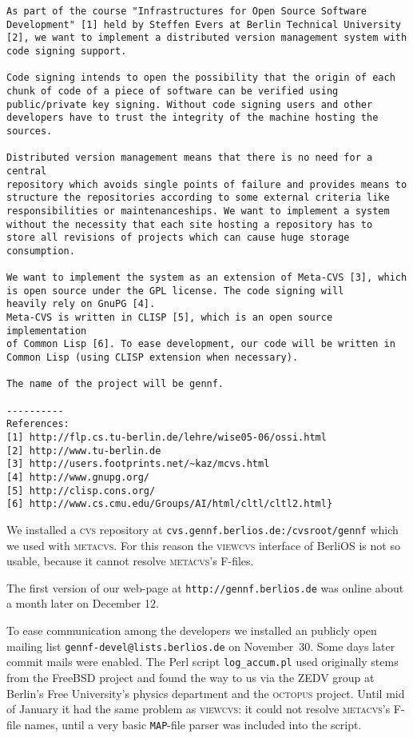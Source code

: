 \documentclass[fleqn, 10pt, a4paper]{report} \usepackage{amssymb}
\begin{document}
\begin{verbatim}
As part of the course "Infrastructures for Open Source Software
Development" [1] held by Steffen Evers at Berlin Technical University
[2], we want to implement a distributed version management system with
code signing support.

Code signing intends to open the possibility that the origin of each
chunk of code of a piece of software can be verified using
public/private key signing. Without code signing users and other
developers have to trust the integrity of the machine hosting the
sources.

Distributed version management means that there is no need for a central
repository which avoids single points of failure and provides means to
structure the repositories according to some external criteria like
responsibilities or maintenanceships. We want to implement a system
without the necessity that each site hosting a repository has to
store all revisions of projects which can cause huge storage
consumption.

We want to implement the system as an extension of Meta-CVS [3], which
is open source under the GPL license. The code signing will 
heavily rely on GnuPG [4].
Meta-CVS is written in CLISP [5], which is an open source implementation
of Common Lisp [6]. To ease development, our code will be written in
Common Lisp (using CLISP extension when necessary).

The name of the project will be gennf.

----------
References:
[1] http://flp.cs.tu-berlin.de/lehre/wise05-06/ossi.html
[2] http://www.tu-berlin.de
[3] http://users.footprints.net/~kaz/mcvs.html
[4] http://www.gnupg.org/
[5] http://clisp.cons.org/
[6] http://www.cs.cmu.edu/Groups/AI/html/cltl/cltl2.html}
\end{verbatim}

We installed a \textsc{cvs} repository at
\texttt{cvs.gennf.berlios.de:/cvsroot/gennf} which we used with
\textsc{metacvs}. For this reason the \textsc{viewcvs} interface of
BerliOS is not so usable, because it cannot resolve \textsc{metacvs}'s
F-files.

The first version of our web-page at \texttt{http://gennf.berlios.de}
was online about a month later on December 12.

To ease communication among the developers we installed an publicly
open mailing list \texttt{gennf-devel@lists.berlios.de} on
November~30. Some days later commit mails were enabled.  The Perl
script \texttt{log\_accum.pl} used originally stems from the FreeBSD
project and found the way to us via the ZEDV group at Berlin's Free
University's physics department and the \textsc{octopus} project.
Until mid of January it had the same problem as \textsc{viewcvs}: it
could not resolve \textsc{metacvs}'s F-file names, until a very basic
\texttt{MAP}-file parser was included into the script.
\end{document}
